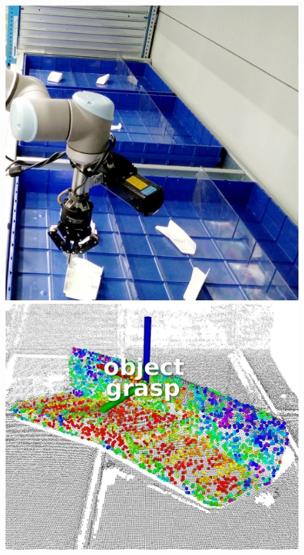 \begin{figure}[h!]
{\begin{tcolorbox}
	\includegraphics[height=.15\textheight]{Cap5/Figuras/picking_embraer/side-5}\\
	\includegraphics[height=.15\textheight]{Cap5/Figuras/picking_embraer/perception-6}

\end{tcolorbox}}
\end{figure}
